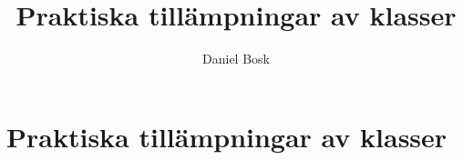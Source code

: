 \documentclass[a4paper,10pt,oneside,openright,
               oldfontcommands]{memoir}
\begin{document}
\title{%
  Praktiska tillämpningar av klasser
}
\author{Daniel Bosk}

\maketitle

\begin{abstract}
  
\end{abstract}

\clearpage

\tableofcontents*

\chapter{Praktiska tillämpningar av klasser}



\appendix


\printbibliography
\end{document}
